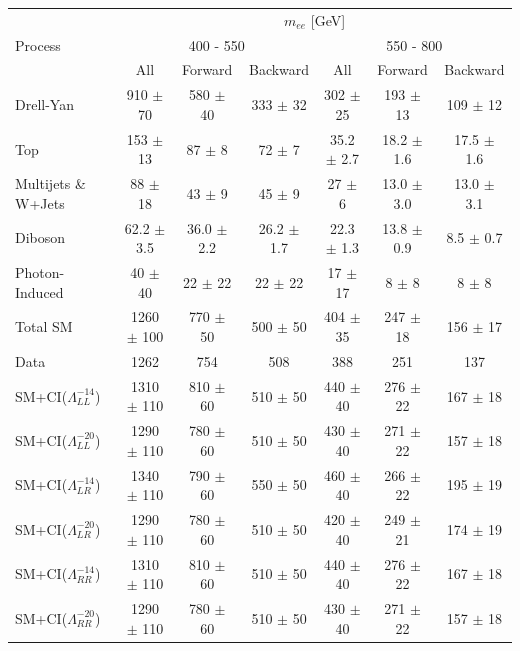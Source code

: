 	\begin {table}[h]
		\scriptsize  
		\begin{center}
		\begin{tabular}{  l | c c c | c c c  } 
			\hline
			\hline
			\multirow{3}{*}{Process} 	& \multicolumn{6}{c}{$m_{ee}$ [GeV]} \\
										& \multicolumn{3}{c}{400 - 550} & \multicolumn{3}{c}{550 - 800} \\
										\cline{2-7}
										& All & Forward & Backward & All & Forward & Backward \\
			\hline
			Drell-Yan & 910 $\pm$ 70 & 580 $\pm$ 40 & 333 $\pm$ 32 & 302 $\pm$ 25 & 193 $\pm$ 13 & 109 $\pm$ 12 \\
			Top & 153 $\pm$ 13 & 87 $\pm$ 8 & 72 $\pm$ 7 & 35.2 $\pm$ 2.7 & 18.2 $\pm$ 1.6 & 17.5 $\pm$ 1.6 \\
			Multijets \& W+Jets & 88 $\pm$ 18 & 43 $\pm$ 9 & 45 $\pm$ 9 & 27 $\pm$ 6 & 13.0 $\pm$ 3.0 & 13.0 $\pm$ 3.1 \\
			Diboson & 62.2 $\pm$ 3.5 & 36.0 $\pm$ 2.2 & 26.2 $\pm$ 1.7 & 22.3 $\pm$ 1.3 & 13.8 $\pm$ 0.9 & 8.5 $\pm$ 0.7 \\
			Photon-Induced & 40 $\pm$ 40 & 22 $\pm$ 22 & 22 $\pm$ 22 & 17 $\pm$ 17 & 8 $\pm$ 8 & 8 $\pm$ 8 \\
			\hline
			Total SM & 1260 $\pm$ 100 & 770 $\pm$ 50 & 500 $\pm$ 50 & 404 $\pm$ 35 & 247 $\pm$ 18 & 156 $\pm$ 17 \\
			\hline
			Data & 1262 & 754 & 508 & 388 & 251 & 137 \\
			\hline
			SM+CI($\Lambda^{-14}_{LL}$) & 1310 $\pm$ 110 & 810 $\pm$ 60 & 510 $\pm$ 50 & 440 $\pm$ 40 & 276 $\pm$ 22 & 167 $\pm$ 18 \\
			SM+CI($\Lambda^{-20}_{LL}$) & 1290 $\pm$ 110 & 780 $\pm$ 60 & 510 $\pm$ 50 & 430 $\pm$ 40 & 271 $\pm$ 22 & 157 $\pm$ 18 \\
			SM+CI($\Lambda^{-14}_{LR}$) & 1340 $\pm$ 110 & 790 $\pm$ 60 & 550 $\pm$ 50 & 460 $\pm$ 40 & 266 $\pm$ 22 & 195 $\pm$ 19 \\
			SM+CI($\Lambda^{-20}_{LR}$) & 1290 $\pm$ 110 & 780 $\pm$ 60 & 510 $\pm$ 50 & 420 $\pm$ 40 & 249 $\pm$ 21 & 174 $\pm$ 19 \\
			SM+CI($\Lambda^{-14}_{RR}$) & 1310 $\pm$ 110 & 810 $\pm$ 60 & 510 $\pm$ 50 & 440 $\pm$ 40 & 276 $\pm$ 22 & 167 $\pm$ 18 \\
			SM+CI($\Lambda^{-20}_{RR}$) & 1290 $\pm$ 110 & 780 $\pm$ 60 & 510 $\pm$ 50 & 430 $\pm$ 40 & 271 $\pm$ 22 & 157 $\pm$ 18 \\
			\hline

\end{tabular}
\end{center}
\end{table}
